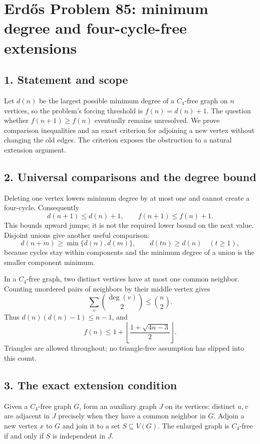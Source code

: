 \section*{Erd\H{o}s Problem 85: minimum degree and four-cycle-free extensions}

\subsection*{1. Statement and scope}
Let $d(n)$ be the largest possible minimum degree of a $C_4$-free graph on $n$ vertices, so the problem's forcing threshold is $f(n)=d(n)+1$. The question whether $f(n+1)\ge f(n)$ eventually remains unresolved. We prove comparison inequalities and an exact criterion for adjoining a new vertex without changing the old edges. The criterion exposes the obstruction to a natural extension argument.

\subsection*{2. Universal comparisons and the degree bound}
Deleting one vertex lowers minimum degree by at most one and cannot create a four-cycle. Consequently
\[
 d(n+1)\le d(n)+1,\qquad f(n+1)\le f(n)+1.\tag{1}
\]
This bounds upward jumps; it is not the required lower bound on the next value. Disjoint unions give another useful comparison:
\[
 d(n+m)\ge\min\{d(n),d(m)\},\qquad d(tn)\ge d(n)\quad(t\ge1),\tag{2}
\]
because cycles stay within components and the minimum degree of a union is the smaller component minimum.

In a $C_4$-free graph, two distinct vertices have at most one common neighbor. Counting unordered pairs of neighbors by their middle vertex gives
\[
 \sum_v\binom{\deg(v)}2\le\binom n2.
\]
Thus $d(n)(d(n)-1)\le n-1$, and
\[
 f(n)\le1+\left\lfloor\frac{1+\sqrt{4n-3}}2\right\rfloor.\tag{3}
\]
Triangles are allowed throughout; no triangle-free assumption has slipped into this count.

\subsection*{3. The exact extension condition}
Given a $C_4$-free graph $G$, form an auxiliary graph $J$ on its vertices: distinct $u,v$ are adjacent in $J$ precisely when they have a common neighbor in $G$. Adjoin a new vertex $x$ to $G$ and join it to a set $S\subseteq V(G)$. The enlarged graph is $C_4$-free if and only if $S$ is independent in $J$.

